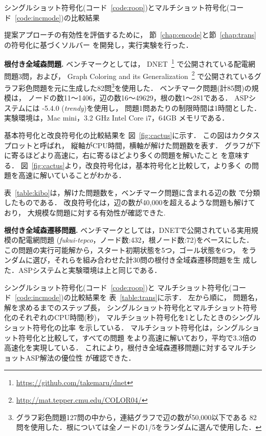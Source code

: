 \begin{table}[t]
  \centering
  \caption{シングルショット符号化(コード~\ref{code:roop})とマルチショット符号化(コード~\ref{code:incmode})の比較結果}
  \label{table:trans}
  
\end{table}

提案アプローチの有効性を評価するために，
節~\ref{chap:encode}と節~\ref{chap:trans}の符号化に基づくソルバー
を開発し，実行実験を行った．

\textbf{根付き全域森問題.}
ベンチマークとしては，
DNET~\footnote{\url{https://github.com/takemaru/dnet}}
で公開されている配電網問題3問，および，
Graph Coloring and its Generalization~\footnote{\url{http://mat.tepper.cmu.edu/COLOR04/}}
で公開されているグラフ彩色問題を元に生成した82問\footnote{%
グラフ彩色問題127問の中から，連結グラフで辺の数が50,000以下である
82問を使用した．根については全ノードの1/5をランダムに選んで使用した．
}を使用した．
ベンチマーク問題(計85問)の規模は，
ノードの数11〜1406，辺の数16〜49629，根の数1〜281である．
%
ASPシステムには {\clingo}-5.4.0 (\textit{trendy})を使用し，
問題1問あたりの制限時間は1時間とした．
実験環境は，Mac mini，3.2 GHz Intel Core i7，64GB メモリである．

基本符号化と改良符号化の比較結果を
図~\ref{fig:cactus}に示す．
この図はカクタスプロットと呼ばれ，
縦軸がCPU時間，横軸が解けた問題数を表す．
グラフが下に寄るほどより高速に，右に寄るほどより多くの問題を解いたこと
を意味する．
図~\ref{fig:cactus}より，改良符号化は，基本符号化と比較して，より多く
の問題を高速に解いていることがわかる．

表~\ref{table:kibo}は，解けた問題数を，ベンチマーク問題に含まれる辺の数
で分類したものである．
改良符号化は，辺の数が40,000を超えるような問題も解けており，
大規模な問題に対する有効性が確認できた. 

\textbf{根付き全域森遷移問題.}
ベンチマークとしては，DNETで公開されている実用規模の配電網問題
(\textit{fukui-tepco}，ノード数:432，根ノード数:72)をベースにした．
この問題の実行可能解から，スタート初期状態を5つ，ゴール状態を6つ，
をランダムに選び，それらを組み合わせた計30問の根付き全域森遷移問題を生
成した．ASPシステムと実験環境は上と同じである．

シングルショット符号化(コード~\ref{code:roop})と
マルチショット符号化(コード~\ref{code:incmode})の比較結果を
表~\ref{table:trans}に示す．
左から順に，
問題名，
解を求めるまでのステップ長，
シングルショット符号化とマルチショット符号化のそれぞれのCPU時間(秒)，
マルチショット符号化を1としたときのシングルショット符号化の比率
を示している．
マルチショット符号化は，シングルショット符号化と比較して，すべての問題
をより高速に解いており，平均で3.3倍の高速化を実現している．
これにより，根付き全域森遷移問題に対するマルチショットASP解法の優位性
が確認できた．

